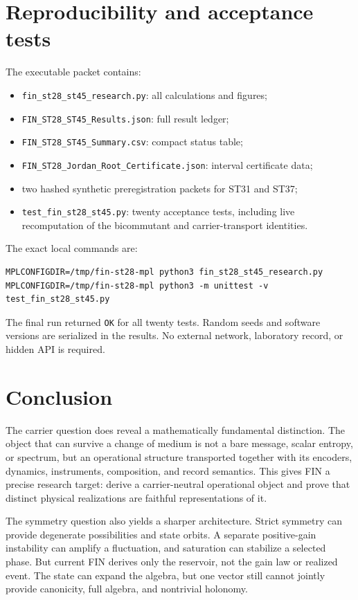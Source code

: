 \documentclass[11pt,a4paper]{article}
\begin{document}
\section{Reproducibility and acceptance tests}

The executable packet contains:
\begin{itemize}
\item \texttt{fin\_st28\_st45\_research.py}: all calculations and figures;
\item \texttt{FIN\_ST28\_ST45\_Results.json}: full result ledger;
\item \texttt{FIN\_ST28\_ST45\_Summary.csv}: compact status table;
\item \texttt{FIN\_ST28\_Jordan\_Root\_Certificate.json}: interval certificate data;
\item two hashed synthetic preregistration packets for ST31 and ST37;
\item \texttt{test\_fin\_st28\_st45.py}: twenty acceptance tests, including live recomputation of the bicommutant and carrier-transport identities.
\end{itemize}

The exact local commands are:
\begin{verbatim}
MPLCONFIGDIR=/tmp/fin-st28-mpl python3 fin_st28_st45_research.py
MPLCONFIGDIR=/tmp/fin-st28-mpl python3 -m unittest -v test_fin_st28_st45.py
\end{verbatim}
The final run returned \texttt{OK} for all twenty tests. Random seeds and software versions are serialized in the results. No external network, laboratory record, or hidden API is required.

\section{Conclusion}

The carrier question does reveal a mathematically fundamental distinction. The object that can survive a change of medium is not a bare message, scalar entropy, or spectrum, but an operational structure transported together with its encoders, dynamics, instruments, composition, and record semantics. This gives FIN a precise research target: derive a carrier-neutral operational object and prove that distinct physical realizations are faithful representations of it.

The symmetry question also yields a sharper architecture. Strict symmetry can provide degenerate possibilities and state orbits. A separate positive-gain instability can amplify a fluctuation, and saturation can stabilize a selected phase. But current FIN derives only the reservoir, not the gain law or realized event. The state can expand the algebra, but one vector still cannot jointly provide canonicity, full algebra, and nontrivial holonomy.
\end{document}
